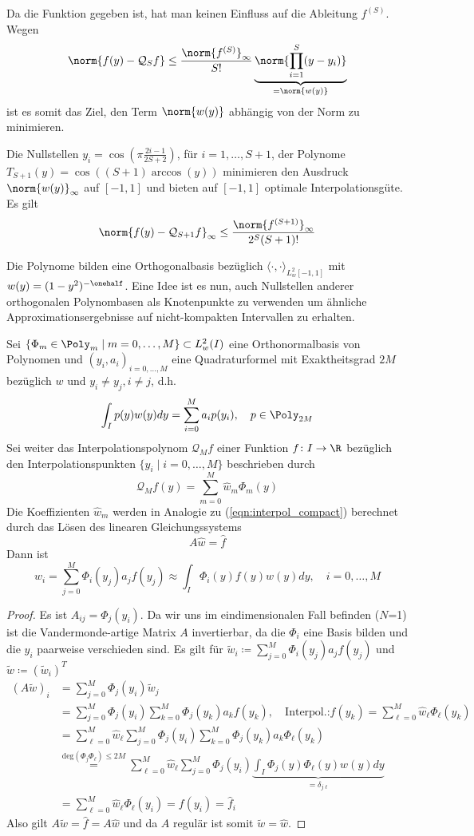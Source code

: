 Da die Funktion gegeben ist, hat man keinen Einfluss auf die Ableitung $f^{(S)}$. Wegen
\[\norm{f(y)-\mathcal{Q}_{S}f}\le \frac{\norm{f^{(S)}}_\infty}{S!}\underbrace{\norm{\prod_{i=1}^{S}(y-y_i)}}_{=\norm{w(y)}}\]
ist es somit das Ziel, den Term $\norm{w(y)}$ abhängig von der Norm zu minimieren.
\begin{mathbem}
\label{bem:cheby}
Die Nullstellen $y_i=\cos\left(\pi\frac{2i-1}{2S+2}\right)$, für $i=1,\dots,S+1$, der \chebyspace Polynome $T_{S+1}(y)=\cos((S+1)\arccos(y))$ minimieren den Ausdruck $\norm{w(y)}_\infty$ auf $[-1,1]$ und bieten auf $[-1,1]$ optimale Interpolationsgüte. Es gilt 
\[\norm{f(y)-\mathcal{Q}_{S+1}f}_\infty\le \frac{\norm{f^{(S+1)}}_\infty}{2^S(S+1)!}\]
\end{mathbem}
Die \chebyspace Polynome bilden eine Orthogonalbasis bezüglich $\langle \cdot,\cdot\rangle_{L_w^2[-1,1]}$ mit $w(y)=(1-y^2)^{-\onehalf}$. Eine Idee ist es nun, auch Nullstellen anderer orthogonalen Polynombasen als Knotenpunkte zu verwenden um ähnliche Approximationsergebnisse auf nicht-kompakten Intervallen zu erhalten.
\begin{maththeorem}
\label{th:interpol_and_proj}
Sei $\lbrace \Phi_m\in\Poly_m\mid m=0,\dots,M\rbrace\subset L_w^2(I)$ eine Orthonormalbasis von Polynomen und $(y_i,a_i)_{i=0,\dots,M}$ eine Quadraturformel mit Exaktheitsgrad $2M$ bezüglich $w$ und $y_i\neq y_j,i\neq j$, d.h. \[\int_I p(y)w(y)dy=\sum_{i=0}^M a_ip(y_i),\quad p\in\Poly_{2M}\]
Sei weiter das Interpolationspolynom  $\mathcal{Q}_Mf$ einer Funktion $f\colon I\to\R$ bezüglich den Interpolationspunkten $\lbrace y_i\mid i=0,\dots,M\rbrace$ beschrieben durch
\[\mathcal{Q}_Mf(y)=\sum_{m=0}^M\hat{w}_m\Phi_m(y)\]
Die Koeffizienten $\hat{w}_m$ werden in Analogie zu (\ref{eqn:interpol_compact}) berechnet durch das Lösen des linearen Gleichungssystems
\[A\hat{w}=\hat{f}\]
Dann ist \[\hat{w}_i=\sum_{j=0}^M\Phi_i(y_j)a_jf(y_j)\approx \int_I \Phi_i(y)f(y)w(y)dy,\quad i=0,\dots,M\]
\end{maththeorem}
\begin{proof}
Es ist $A_{ij}=\Phi_j(y_i)$. Da wir uns im eindimensionalen Fall befinden ($N$=1) ist die Vandermonde-artige Matrix $A$ invertierbar, da die $\Phi_i$ eine Basis bilden und die $y_i$ paarweise verschieden sind. Es gilt für $\widetilde{w}_i\coloneqq \sum_{j=0}^M\Phi_i(y_j)a_jf(y_j)$ und $\widetilde{w}\coloneqq (\widetilde{w}_i)^T$
\begin{align*}
\left(A\widetilde{w}\right)_i&=\sum_{j=0}^M\Phi_j(y_i)\widetilde{w}_j\\
&=\sum_{j=0}^M\Phi_j(y_i)\sum_{k=0}^M\Phi_j(y_k)a_kf(y_k),\quad \text{Interpol.:} f(y_k)=\sum_{\ell=0}^M\hat{w}_\ell\Phi_\ell(y_k)\\
&=\sum_{\ell=0}^M\hat{w}_\ell \sum_{j=0}^M\Phi_j(y_i)\sum_{k=0}^M\Phi_j(y_k)a_k\Phi_\ell(y_k)\\
&\stackrel{\text{deg}(\Phi_j\Phi_\ell)\le 2M}{=}\sum_{\ell=0}^M\hat{w}_\ell\sum_{j=0}^M\Phi_j(y_i)\underbrace{\int_I\Phi_j(y)\Phi_\ell(y)w(y)dy}_{=\delta_{j\ell}}\\
&=\sum_{\ell=0}^M\hat{w}_\ell\Phi_\ell(y_i)=f(y_i)=\hat{f}_i
\end{align*}
Also gilt $A\widetilde{w}=\hat{f}=A\hat{w}$ und da $A$ regulär ist somit $\widetilde{w}=\hat{w}$.
\end{proof}
